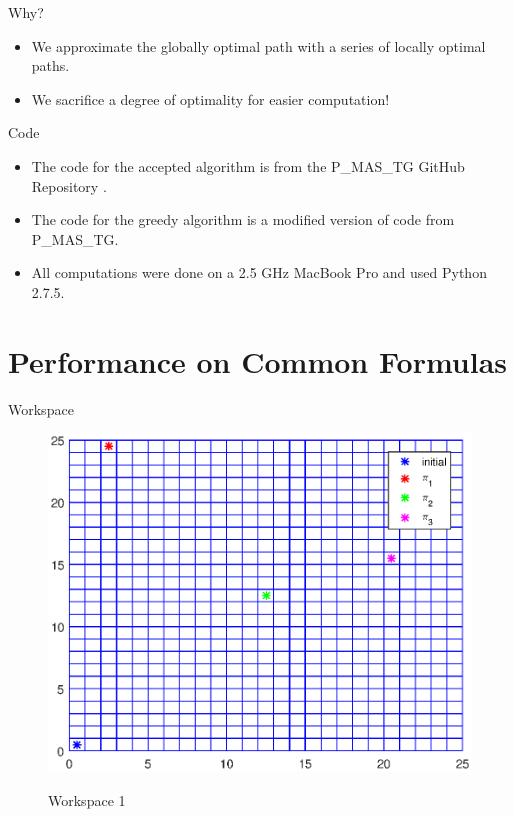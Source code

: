 \documentclass{beamer}
\begin{document}
\begin{frame}{Why?}
\begin{itemize}
\item {
	We approximate the globally optimal path with a series of locally optimal paths.
}
\item {
	We sacrifice a degree of optimality for easier computation!
}
\end{itemize}
\end{frame}

\begin{frame}{Code}
\begin{itemize}
\item The code for the accepted algorithm is from the P\_MAS\_TG GitHub Repository \cite{pMasGit}.
\item The code for the greedy algorithm is a modified version of code from P\_MAS\_TG.
\item All computations were done on a 2.5 GHz MacBook Pro and used Python 2.7.5.
\end{itemize}


\end{frame}
\section{Performance on Common Formulas}

\begin{frame}{Workspace}
\begin{figure}[!htb]
\centering
\includegraphics[scale=0.7]{workspace2.eps}
\label{fig:workspace}
\caption{Workspace 1}
\end{figure}
\end{frame}
\end{document}
